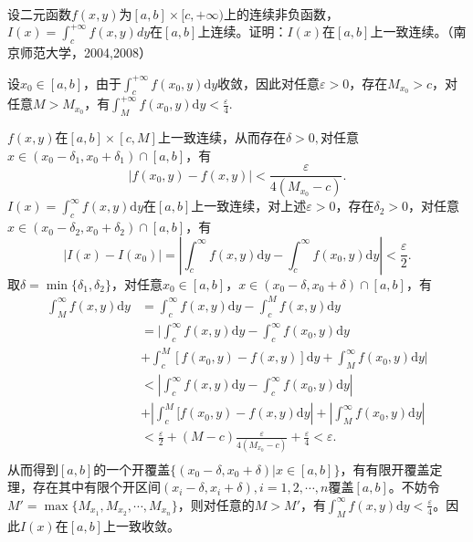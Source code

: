 \begin{exercise}
\hfill\\
  设二元函数$f(x,y)$为$[a,b]\times[c,+\infty)$上的连续非负函数，$I(x)=\int_c^{+\infty}f(x,y)dy$在$[a,b]$上连续。证明：$I(x)$在$[a,b]$上一致连续。（南京师范大学，2004,2008）

设$x_0\in[a,b]$，由于$\int_c^{+\infty}f(x_0,y)\mathrm{d}y$收敛，因此对任意$\varepsilon>0$，存在$M_{x_0}>c$，对任意$M>M_{x_0}$，有$\int_M^{+\infty}f(x_0,y)\mathrm{d}y<\frac{\varepsilon}{4}.$

$f(x,y)$在$[a,b]\times[c,M]$上一致连续，从而存在$\delta>0,$对任意$x\in(x_0-\delta_1,x_0+\delta_1)\cap[a,b]$，有$$|f(x_0,y)-f(x,y)|<\frac{\varepsilon}{4(M_{x_0}-c)}.$$
$I(x)=\int_c^{\infty}f(x,y)\mathrm{d}y$在$[a,b]$上一致连续，对上述$\varepsilon>0$，存在$\delta_2>0$，对任意$x\in(x_0-\delta_2,x_0+\delta_2)\cap[a,b]$，有
$$|I(x)-I(x_0)|=|\int_c^{\infty}f(x,y)\mathrm{d}y-\int_c^{\infty}f(x_0,y)\mathrm{d}y|<\frac{\varepsilon}{2}.$$
取$\delta=\min\{\delta_1,\delta_2\}$，对任意$x_0\in[a,b]$，$x\in(x_0-\delta,x_0+\delta)\cap[a,b]$，有
\begin{align*}
\int_M^{\infty}f(x,y)\mathrm{d}y&=\int_c^{\infty}f(x,y)\mathrm{d}y-\int_c^Mf(x,y)\mathrm{d}y\\
&=|\int_c^{\infty}f(x,y)\mathrm{d}y-\int_c^{\infty}f(x_0,y)\mathrm{d}y\\
&+\int_c^M[f(x_0,y)-f(x,y)]\mathrm{d}y+\int_M^{\infty}f(x_0,y)\mathrm{d}y|\\
&<|\int_c^{\infty}f(x,y)\mathrm{d}y-\int_c^{\infty}f(x_0,y)\mathrm{d}y|\\
&+|\int_c^M[f(x_0,y)-f(x,y)\mathrm{d}y|+|\int_M^{\infty}f(x_0,y)\mathrm{d}y|\\
&<\frac{\varepsilon}{2}+(M-c)\frac{\varepsilon}{4(M_{x_0}-c)}+\frac{\varepsilon}{4}<\varepsilon.\\
\end{align*}
从而得到$[a,b]$的一个开覆盖$\{(x_0-\delta,x_0+\delta)|x\in[a,b]\}$，有有限开覆盖定理，存在其中有限个开区间$(x_i-\delta,x_i+\delta),i=1,2,\cdots,n$覆盖$[a,b]$。不妨令$M'=\max\{M_{x_1},M_{x_2},\cdots,M_{x_n}\}$，则对任意的$M>M'$，有$\int_M^{\infty}f(x,y)\mathrm{d}y<\frac{\varepsilon}{4}$。因此$I(x)$在$[a,b]$上一致收敛。
\end{exercise}
  \hfill\\

